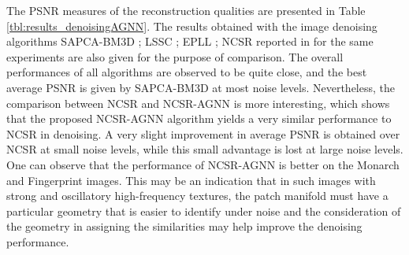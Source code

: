 \documentclass[journal]{IEEEtran}
\begin{document}
The PSNR measures of the reconstruction qualities are presented in Table \ref{tbl:results_denoisingAGNN}. The results obtained with the image denoising algorithms SAPCA-BM3D \cite{Katkovnik10from}; LSSC \cite{Mairal09non}; EPLL \cite{Zoran11from}; NCSR \cite{Dong13nonlocally} reported in \cite{Dong13nonlocally} for the same experiments are also given for the purpose of comparison. The overall performances of all algorithms are observed to be quite close, and the best average PSNR is given by SAPCA-BM3D at most noise levels. Nevertheless, the comparison between NCSR and NCSR-AGNN is more interesting, which shows that the proposed NCSR-AGNN algorithm yields a very similar performance to NCSR in denoising. A very slight improvement in average PSNR is obtained over NCSR at small noise levels, while this small advantage is lost at large noise levels. %
One can observe that the performance of NCSR-AGNN is better on the Monarch and Fingerprint images. This may be an indication that in such images with strong and oscillatory high-frequency textures, the patch manifold must have a particular geometry that is easier to identify under noise and the consideration of the geometry in assigning the similarities may help improve the denoising performance.
\end{document}
